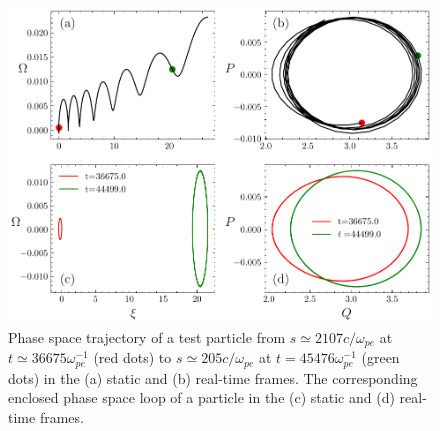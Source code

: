 \begin{figure}
    \centering
    \includegraphics[scale=0.5]{img/Trajectory.pdf}
    \caption{Phase space trajectory of a test particle from $s \simeq 2107 c/\omega_{pe}$ at $t\simeq 36675 \omega_{pe}^{-1}$ 
    (red dots)
     to $s \simeq 205 c/\omega_{pe}$ at $t=45476 \omega_{pe}^{-1}$ 
    (green dots)
      in the (a) static  and  (b) real-time frames.  The corresponding enclosed phase space loop of a particle in the (c)  static and  (d) real-time  frames. 
    \label{fig.traj} 
    }
\end{figure}

